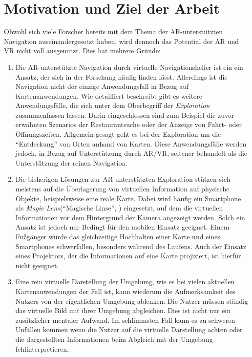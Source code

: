 \section{Motivation und Ziel der Arbeit}
\label{sec:motivation_ziel}
Obwohl sich viele Forscher bereits mit dem Thema der \gls{AR}-unterstützten Navigation auseinandergesetzt haben, wird dennoch das Potential der \gls{AR} und \gls{VR} nicht voll ausgenutzt.
Dies hat mehrere Gründe:
\begin{enumerate}
\item Die \gls{AR}-unterstützte Navigation durch virtuelle Navigationshelfer ist ein ein Ansatz, der sich in der Forschung häufig finden lässt.
Allerdings ist die Navigation nicht der einzige Anwendungsfall in Bezug auf Kartenanwendungen.
Wie \textcite{Reichenbacher2001} detailliert beschreibt gibt es weitere Anwendungsfälle, die sich unter dem Oberbegriff der \emph{Exploration} zusammenfassen lassen.
Darin eingeschlossen sind zum Beispiel die zuvor erwähnten Szenarios der Restaurantsuche oder der Anzeige von Fahrt- oder Öffnungszeiten.
Allgemein gesagt geht es bei der Exploration um die \enquote{Entdeckung} von Orten anhand von Karten.
Diese Anwendungsfälle werden jedoch, in Bezug auf Unterstützung durch \gls{AR}/\gls{VR}, seltener behandelt als die Unterstützung der reinen Navigation.

\item Die bisherigen Lösungen zur \gls{AR}-unterstützten Exploration stützen sich meistens auf die Überlagerung von virtuellen Information auf physische Objekte, beispielsweise eine reale Karte.
Dabei wird häufig ein Smartphone als \emph{Magic Lens}(\enquote{Magische Linse}, \cite{Bier1994}) eingesetzt, auf dem die virtuellen Informationen vor dem Hintergrund der Kamera angezeigt werden.
Solch ein Ansatz ist jedoch nur Bedingt für den mobilen Einsatz geeignet.
Einem Fußgänger würde das gleichzeitige Hochhalten einer Karte und eines Smartphones schwerfallen, besonders während des Laufens.
Auch der Einsatz eines Projektors, der die Informationen auf eine Karte projiziert, ist hierfür nicht geeignet.

\item Eine rein virtuelle Darstellung der Umgebung, wie es bei vielen aktuellen Kartenanwendungen der Fall ist, kann wiederum die Aufmerksamkeit des Nutzers von der eigentlichen Umgebung ablenken.
Die Nutzer müssen ständig das virtuelle Bild mit ihrer Umgebung abgleichen.
Dies ist nicht nur ein zusätzlicher mentaler Aufwand.
Im schlimmsten Fall kann es zu schweren Unfällen kommen wenn die Nutzer auf die virtuelle Darstellung achten oder die dargestellten Informationen beim Abgleich mit der Umgebung fehlinterpretieren.


\end{enumerate}
